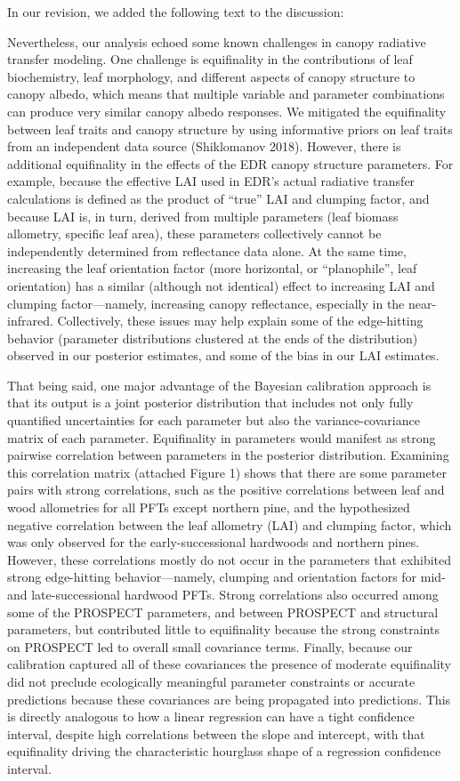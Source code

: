In our revision, we added the following text to the discussion:

Nevertheless, our analysis echoed some known challenges in canopy radiative transfer modeling. One challenge is equifinality in the contributions of leaf biochemistry, leaf morphology, and different aspects of canopy structure to canopy albedo, which means that multiple variable and parameter combinations can produce very similar canopy albedo responses. We mitigated the equifinality between leaf traits and canopy structure by using informative priors on leaf traits from an independent data source (Shiklomanov 2018). However, there is additional equifinality in the effects of the EDR canopy structure parameters. For example, because the effective LAI used in EDR’s actual radiative transfer calculations is defined as the product of “true” LAI and clumping factor, and because LAI is, in turn, derived from multiple parameters (leaf biomass allometry, specific leaf area), these parameters collectively cannot be independently determined from reflectance data alone. At the same time, increasing the leaf orientation factor (more horizontal, or “planophile”, leaf orientation) has a similar (although not identical) effect to increasing LAI and clumping factor---namely, increasing canopy reflectance, especially in the near-infrared. Collectively, these issues may help explain some of the edge-hitting behavior (parameter distributions clustered at the ends of the distribution) observed in our posterior estimates, and some of the bias in our LAI estimates.

That being said, one major advantage of the Bayesian calibration approach is that its output is a joint posterior distribution that includes not only fully quantified uncertainties for each parameter but also the variance-covariance matrix of each parameter. Equifinality in parameters would manifest as strong pairwise correlation between parameters in the posterior distribution. Examining this correlation matrix (attached Figure 1) shows that there are some parameter pairs with strong correlations, such as the positive correlations between leaf and wood allometries for all PFTs except northern pine, and the hypothesized negative correlation between the leaf allometry (LAI) and clumping factor, which was only observed for the early-successional hardwoods and northern pines. However, these correlations mostly do not occur in the parameters that exhibited strong edge-hitting behavior---namely, clumping and orientation factors for mid- and late-successional hardwood PFTs. Strong correlations also occurred among some of the PROSPECT parameters, and between PROSPECT and structural parameters, but contributed little to equifinality because the strong constraints on PROSPECT led to overall small covariance terms. Finally, because our calibration captured all of these covariances the presence of moderate equifinality did not preclude ecologically meaningful parameter constraints or accurate predictions because these covariances are being propagated into predictions. This is directly analogous to how a linear regression can have a tight confidence interval, despite high correlations between the slope and intercept, with that equifinality driving the characteristic hourglass shape of a regression confidence interval.

